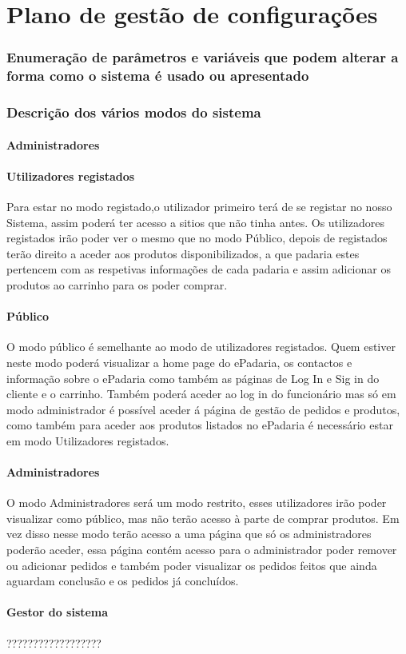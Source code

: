 \chapter{Plano de gestão de configurações}
\label{plano_de_gestao_de_configuracoes}

\subsection{Enumeração de parâmetros e variáveis que podem alterar a forma como o sistema é usado ou apresentado}

\subsection{Descrição dos vários modos do sistema}
\subsubsection{Administradores}
\subsubsection{Utilizadores registados}
Para estar no modo registado,o utilizador primeiro terá de se registar no nosso Sistema, assim poderá ter acesso a sitios que não tinha antes. Os utilizadores registados irão poder ver o mesmo que no modo Público, depois de registados terão direito a aceder aos produtos disponibilizados, a que padaria estes pertencem com as respetivas informações de cada padaria e assim adicionar os produtos ao carrinho para os poder comprar.
\subsubsection{Público}
O modo público é semelhante ao modo de utilizadores registados. Quem estiver neste modo poderá visualizar a home page do ePadaria, os contactos e informação sobre o ePadaria como também as páginas de Log In e Sig in do cliente e o carrinho. Também poderá aceder ao log in do funcionário mas só em modo administrador é possível aceder á página de gestão de pedidos e produtos, como também para aceder aos produtos listados no ePadaria é necessário estar em modo Utilizadores registados.
\subsubsection{Administradores}
O modo Administradores será um modo restrito, esses utilizadores irão poder visualizar como público, mas não terão acesso à parte de comprar produtos. Em vez disso nesse modo terão acesso a uma página que só os administradores poderão aceder, essa página contém acesso para o administrador poder remover ou adicionar pedidos e também poder visualizar os pedidos feitos que ainda aguardam conclusão e os pedidos já concluídos.
\subsubsection{Gestor do sistema}
??????????????????